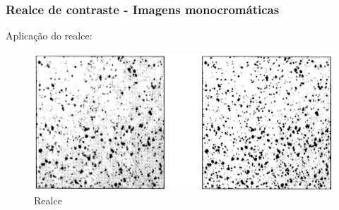 \documentclass[aspectratio=169]{beamer}
\theoremstyle{Definition}
\begin{document}
\begin{frame}
	\frametitle{Realce de contraste - Imagens monocromáticas}
	
	Aplicação do realce: 
	\begin{figure}[h]
	 	\includegraphics[width=0.6\paperwidth,height=0.6\paperheight]{imagens/realce1}
		\caption{Realce}\label{figCont3}
	\end{figure}
	
\end{frame}
\end{document}
